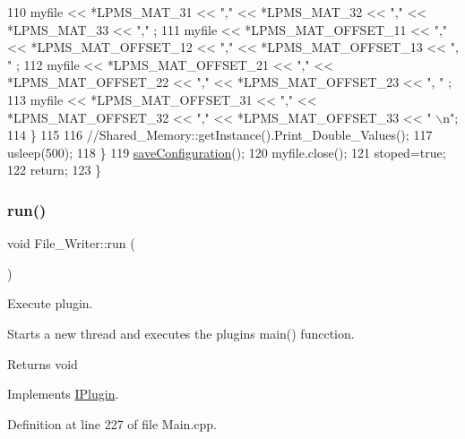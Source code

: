 \begin{DoxyCode}
110             myfile << *LPMS\_MAT\_31 << \textcolor{stringliteral}{","} << *LPMS\_MAT\_32 << \textcolor{stringliteral}{","} << *LPMS\_MAT\_33 << \textcolor{stringliteral}{","} ;
111             myfile << *LPMS\_MAT\_OFFSET\_11 << \textcolor{stringliteral}{","} << *LPMS\_MAT\_OFFSET\_12 << \textcolor{stringliteral}{","} << *LPMS\_MAT\_OFFSET\_13 << \textcolor{stringliteral}{",
      "} ;
112             myfile << *LPMS\_MAT\_OFFSET\_21 << \textcolor{stringliteral}{","} << *LPMS\_MAT\_OFFSET\_22 << \textcolor{stringliteral}{","} << *LPMS\_MAT\_OFFSET\_23 << \textcolor{stringliteral}{",
      "} ;
113             myfile << *LPMS\_MAT\_OFFSET\_31 << \textcolor{stringliteral}{","} << *LPMS\_MAT\_OFFSET\_32 << \textcolor{stringliteral}{","} << *LPMS\_MAT\_OFFSET\_33 << \textcolor{stringliteral}{"
      \(\backslash\)n"};
114         \}
115 
116         \textcolor{comment}{//Shared\_Memory::getInstance().Print\_Double\_Values();}
117         usleep(500);
118     \}
119     \hyperlink{class_file___writer_a6561b234c4ce33315aa5931463a1cb20}{saveConfiguration}();
120     myfile.close();
121     stoped=\textcolor{keyword}{true};
122     \textcolor{keywordflow}{return};
123 \}
\end{DoxyCode}
\mbox{\label{class_file___writer_a3a7de57b86f801257806115b54136fd7}} 
\subsubsection{\texorpdfstring{run()}{run()}}
{\footnotesize\ttfamily void File\+\_\+\+Writer\+::run (\begin{DoxyParamCaption}{ }\end{DoxyParamCaption})\hspace{0.3cm}{\ttfamily [virtual]}}



Execute plugin. 

Starts a new thread and executes the plugins main() funcction. \begin{DoxyReturn}{Returns}
void 
\end{DoxyReturn}


Implements \hyperlink{class_i_plugin_a46b4ace767e77f9db9c9585e99c09039}{I\+Plugin}.



Definition at line 227 of file Main.\+cpp.



